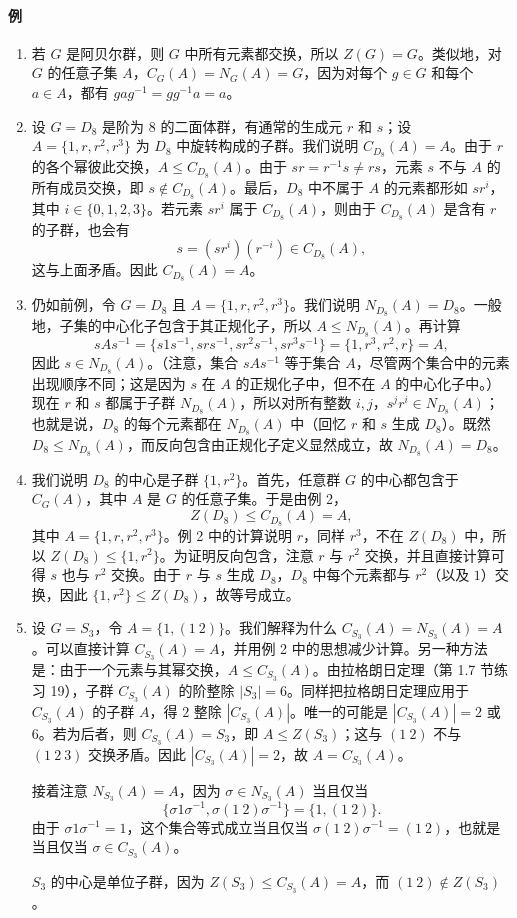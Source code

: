 \paragraph{例}
\begin{enumerate}[label=(\arabic*)]
  \item 若 $G$ 是阿贝尔群，则 $G$ 中所有元素都交换，所以 $Z(G)=G$。类似地，对 $G$ 的任意子集 $A$，$C_G(A)=N_G(A)=G$，因为对每个 $g\in G$ 和每个 $a\in A$，都有 $gag^{-1}=gg^{-1}a=a$。
  \item 设 $G=D_8$ 是阶为 $8$ 的二面体群，有通常的生成元 $r$ 和 $s$；设 $A=\{1,r,r^2,r^3\}$ 为 $D_8$ 中旋转构成的子群。我们说明 $C_{D_8}(A)=A$。由于 $r$ 的各个幂彼此交换，$A\leq C_{D_8}(A)$。由于 $sr=r^{-1}s\neq rs$，元素 $s$ 不与 $A$ 的所有成员交换，即 $s\notin C_{D_8}(A)$。最后，$D_8$ 中不属于 $A$ 的元素都形如 $sr^i$，其中 $i\in\{0,1,2,3\}$。若元素 $sr^i$ 属于 $C_{D_8}(A)$，则由于 $C_{D_8}(A)$ 是含有 $r$ 的子群，也会有
  \[
    s=(sr^i)(r^{-i})\in C_{D_8}(A),
  \]
  这与上面矛盾。因此 $C_{D_8}(A)=A$。
  \item 仍如前例，令 $G=D_8$ 且 $A=\{1,r,r^2,r^3\}$。我们说明 $N_{D_8}(A)=D_8$。一般地，子集的中心化子包含于其正规化子，所以 $A\leq N_{D_8}(A)$。再计算
  \[
    sAs^{-1}=\{s1s^{-1},srs^{-1},sr^2s^{-1},sr^3s^{-1}\}
    =\{1,r^3,r^2,r\}=A,
  \]
  因此 $s\in N_{D_8}(A)$。（注意，集合 $sAs^{-1}$ 等于集合 $A$，尽管两个集合中的元素出现顺序不同；这是因为 $s$ 在 $A$ 的正规化子中，但不在 $A$ 的中心化子中。）现在 $r$ 和 $s$ 都属于子群 $N_{D_8}(A)$，所以对所有整数 $i,j$，$s^jr^i\in N_{D_8}(A)$；也就是说，$D_8$ 的每个元素都在 $N_{D_8}(A)$ 中（回忆 $r$ 和 $s$ 生成 $D_8$）。既然 $D_8\leq N_{D_8}(A)$，而反向包含由正规化子定义显然成立，故 $N_{D_8}(A)=D_8$。
  \item 我们说明 $D_8$ 的中心是子群 $\{1,r^2\}$。首先，任意群 $G$ 的中心都包含于 $C_G(A)$，其中 $A$ 是 $G$ 的任意子集。于是由例 2，
  \[
    Z(D_8)\leq C_{D_8}(A)=A,
  \]
  其中 $A=\{1,r,r^2,r^3\}$。例 2 中的计算说明 $r$，同样 $r^3$，不在 $Z(D_8)$ 中，所以 $Z(D_8)\leq\{1,r^2\}$。为证明反向包含，注意 $r$ 与 $r^2$ 交换，并且直接计算可得 $s$ 也与 $r^2$ 交换。由于 $r$ 与 $s$ 生成 $D_8$，$D_8$ 中每个元素都与 $r^2$（以及 $1$）交换，因此 $\{1,r^2\}\leq Z(D_8)$，故等号成立。
  \item 设 $G=S_3$，令 $A=\{1,(1\ 2)\}$。我们解释为什么 $C_{S_3}(A)=N_{S_3}(A)=A$。可以直接计算 $C_{S_3}(A)=A$，并用例 2 中的思想减少计算。另一种方法是：由于一个元素与其幂交换，$A\leq C_{S_3}(A)$。由拉格朗日定理（第 1.7 节练习 19），子群 $C_{S_3}(A)$ 的阶整除 $|S_3|=6$。同样把拉格朗日定理应用于 $C_{S_3}(A)$ 的子群 $A$，得 $2$ 整除 $|C_{S_3}(A)|$。唯一的可能是 $|C_{S_3}(A)|=2$ 或 $6$。若为后者，则 $C_{S_3}(A)=S_3$，即 $A\leq Z(S_3)$；这与 $(1\ 2)$ 不与 $(1\ 2\ 3)$ 交换矛盾。因此 $|C_{S_3}(A)|=2$，故 $A=C_{S_3}(A)$。

  接着注意 $N_{S_3}(A)=A$，因为 $\sigma\in N_{S_3}(A)$ 当且仅当
  \[
    \{\sigma1\sigma^{-1},\sigma(1\ 2)\sigma^{-1}\}=\{1,(1\ 2)\}.
  \]
  由于 $\sigma1\sigma^{-1}=1$，这个集合等式成立当且仅当 $\sigma(1\ 2)\sigma^{-1}=(1\ 2)$，也就是当且仅当 $\sigma\in C_{S_3}(A)$。

  $S_3$ 的中心是单位子群，因为 $Z(S_3)\leq C_{S_3}(A)=A$，而 $(1\ 2)\notin Z(S_3)$。
\end{enumerate}

